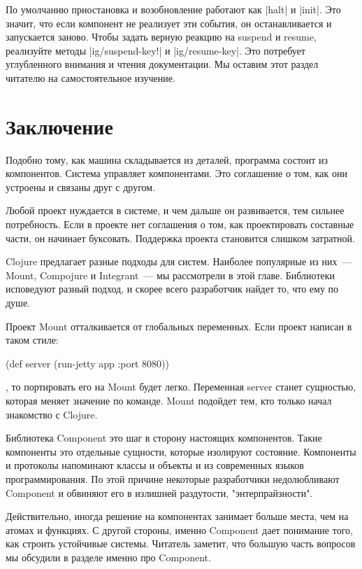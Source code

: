 По умолчанию приостановка и возобновление работают как \spverb|halt| и \spverb|init|. Это
значит, что если компонент не реализует эти события, он останавливается и
запускается заново. Чтобы задать верную реакцию на suspend и resume, реализуйте
методы \spverb|ig/suspend-key!| и \spverb|ig/resume-key|. Это потребует углубленного внимания
и чтения документации. Мы оставим этот раздел читателю на самостоятельное
изучение.

\section{Заключение}

Подобно тому, как машина складывается из деталей, программа состоит из
компонентов. Система управляет компонентами. Это соглашение о том, как они
устроены и связаны друг с другом.

Любой проект нуждается в системе, и чем дальше он развивается, тем сильнее
потребность. Если в проекте нет соглашения о том, как проектировать составные
части, он начинает буксовать. Поддержка проекта становится слишком затратной.

Clojure предлагает разные подходы для систем. Наиболее популярные из них~---
Mount, Compojure и Integrant~--- мы рассмотрели в этой главе. Библиотеки
исповедуют разный подход, и скорее всего разработчик найдет то, что ему по душе.

Проект Mount отталкивается от глобальных переменных. Если проект написан в таком
стиле:

\begin{code}
(def server (run-jetty app {:port 8080}))
\end{code}

, то портировать его на Mount будет легко. Переменная server станет сущностью,
которая меняет значение по команде. Mount подойдет тем, кто только начал
знакомство с Clojure.

Библиотека Component это шаг в сторону настоящих компонентов. Такие компоненты
это отдельные сущности, которые изолируют состояние. Компоненты и протоколы
напоминают классы и объекты и из современных языков программирования. По этой
причине некоторые разработчики недолюбливают Component и обвиняют его в излишней
раздутости, "энтерпрайзности".

Действительно, иногда решение на компонентах занимает больше места, чем на
атомах и функциях. С другой стороны, именно Component дает понимание того, как
строить устойчивые системы. Читатель заметит, что большую часть вопросов мы
обсудили в разделе именно про Component.


